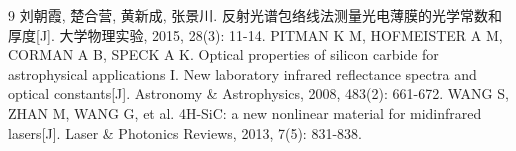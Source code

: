\begin{thebibliography}{9}
     刘朝霞, 楚合营, 黄新成, 张景川. 反射光谱包络线法测量光电薄膜的光学常数和厚度[J]. 大学物理实验, 2015, 28(3): 11-14.
     PITMAN K M, HOFMEISTER A M, CORMAN A B, SPECK A K. Optical properties of silicon carbide for astrophysical applications I. New laboratory infrared reflectance spectra and optical constants[J]. Astronomy \& Astrophysics, 2008, 483(2): 661-672.
     WANG S, ZHAN M, WANG G, et al. 4H-SiC: a new nonlinear material for midinfrared lasers[J]. Laser \& Photonics Reviews, 2013, 7(5): 831-838.
\end{thebibliography}
